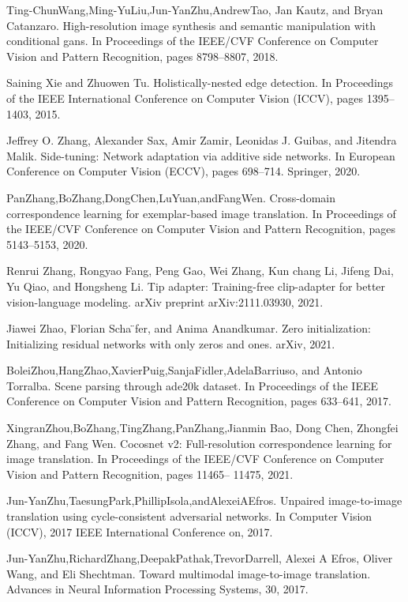 \documentclass[a4paper,AutoFakeBold,oneside,12pt]{book}
\begin{document}
\begin{nopagenumber}
\noindent
[90] Ting-ChunWang,Ming-YuLiu,Jun-YanZhu,AndrewTao, Jan Kautz, and Bryan Catanzaro. High-resolution image synthesis and semantic manipulation with conditional gans. In Proceedings of the IEEE/CVF Conference on Computer Vision and Pattern Recognition, pages 8798–8807, 2018.

\noindent
[91] Saining Xie and Zhuowen Tu. Holistically-nested edge detection. In Proceedings of the IEEE International Conference on Computer Vision (ICCV), pages 1395–1403, 2015.

\noindent
[92] Jeffrey O. Zhang, Alexander Sax, Amir Zamir, Leonidas J. Guibas, and Jitendra Malik. Side-tuning: Network adaptation via additive side networks. In European Conference on Computer Vision (ECCV), pages 698–714. Springer, 2020.

\noindent
[93] PanZhang,BoZhang,DongChen,LuYuan,andFangWen. Cross-domain correspondence learning for exemplar-based image translation. In Proceedings of the IEEE/CVF Conference on Computer Vision and Pattern Recognition, pages 5143–5153, 2020.

\noindent
[94] Renrui Zhang, Rongyao Fang, Peng Gao, Wei Zhang, Kun chang Li, Jifeng Dai, Yu Qiao, and Hongsheng Li. Tip adapter: Training-free clip-adapter for better vision-language modeling. arXiv preprint arXiv:2111.03930, 2021.

\noindent
[95] Jiawei Zhao, Florian Scha ̈fer, and Anima Anandkumar. Zero initialization: Initializing residual networks with only zeros and ones. arXiv, 2021.

\noindent
[96] BoleiZhou,HangZhao,XavierPuig,SanjaFidler,AdelaBarriuso, and Antonio Torralba. Scene parsing through ade20k dataset. In Proceedings of the IEEE Conference on Computer Vision and Pattern Recognition, pages 633–641, 2017.

\noindent
[97] XingranZhou,BoZhang,TingZhang,PanZhang,Jianmin Bao, Dong Chen, Zhongfei Zhang, and Fang Wen. Cocosnet v2: Full-resolution correspondence learning for image translation. In Proceedings of the IEEE/CVF Conference on Computer Vision and Pattern Recognition, pages 11465– 11475, 2021.

\noindent
[98] Jun-YanZhu,TaesungPark,PhillipIsola,andAlexeiAEfros. Unpaired image-to-image translation using cycle-consistent adversarial networks. In Computer Vision (ICCV), 2017 IEEE International Conference on, 2017.

\noindent
[99] Jun-YanZhu,RichardZhang,DeepakPathak,TrevorDarrell, Alexei A Efros, Oliver Wang, and Eli Shechtman. Toward multimodal image-to-image translation. Advances in Neural Information Processing Systems, 30, 2017.


\end{nopagenumber}
\end{document}
